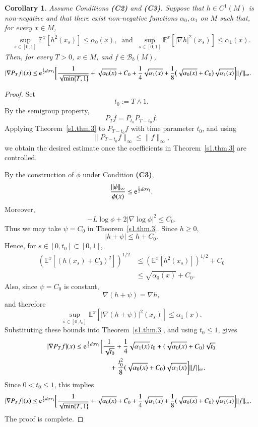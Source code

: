 \documentclass[11pt,twoside, reqno]{article}
\def\e{{\rm e}}
\newcommand\1{\mathbbm{1}}
\newtheorem{corollary}[theorem]{Corollary}
\theoremstyle{definition}
\numberwithin{equation}{section}
\def \e{{\rm e}}
\begin{document}
\begin{corollary}\label{cor-S3-1}
Assume Conditions {\bf(C2)} and {\bf(C3)}. Suppose that \(h\in C^1(M)\) is
non-negative and that there exist non-negative functions
\(\alpha_0,\alpha_1\) on \(M\) such that, for every \(x\in M\),
\begin{align}\label{gradient-ineq-2}
        \sup_{s\in[0,1]}
        \mathbb E^x[h^2(x_s)]
        \leq
        \alpha_0(x),
\ \text{ and }\ 
        \sup_{s\in[0,1]}
        \mathbb E^x[|\nabla h|^2(x_s)]
        \leq
        \alpha_1(x).
\end{align}
Then, for every \(T>0\), \(x\in M\), and \(f\in\mathcal B_b(M)\),
\[
\begin{aligned}
|\nabla P_Tf|(x)
\leq
\e^{\frac12 d\sigma r_1}
\biggl[
&
\frac{1}{\sqrt{\min\{T,1\}}}
+
\sqrt{\alpha_0(x)}+C_0
+\frac{1}{4}\sqrt{\alpha_1(x)}+
\frac18
\bigl(\sqrt{\alpha_0(x)}+C_0\bigr)\sqrt{\alpha_1(x)}
\biggr]
\|f\|_{\infty}.
\end{aligned}
\]
\end{corollary}

\begin{proof}
Set
\[
        t_0:=T\wedge1.
\]
By the semigroup property,
\[
        P_Tf=P_{t_0}P_{T-t_0}f.
\]
Applying Theorem~\ref{s1.thm.3} to \(P_{T-t_0}f\) with time parameter
\(t_0\), and using
\[
        \|P_{T-t_0}f\|_\infty\leq \|f\|_\infty,
\]
we obtain the desired estimate once the coefficients in
Theorem~\ref{s1.thm.3} are controlled.

By the construction of \(\phi\) under Condition {\bf(C3)},
\[
        \frac{\|\phi\|_\infty}{\phi(x)}
        \leq
        \e^{\frac12d\sigma r_1}.
\]
Moreover,
\[
        -L\log\phi+2|\nabla\log\phi|^2\leq C_0.
\]
Thus we may take \(\psi=C_0\) in Theorem~\ref{s1.thm.3}. Since \(h\geq0\),
\[
        |h+\psi|\leq h+C_0.
\]
Hence, for \(s\in[0,t_0]\subset[0,1]\),
\[
\begin{aligned}
\left(\mathbb E^x[(h(x_s)+C_0)^2]\right)^{1/2}
&\leq
\left(\mathbb E^x[h^2(x_s)]\right)^{1/2}+C_0 \\
&\leq
\sqrt{\alpha_0(x)}+C_0 .
\end{aligned}
\]
Also, since \(\psi=C_0\) is constant,
\[
        \nabla(h+\psi)=\nabla h,
\]
and therefore
\[
        \sup_{s\in[0,t_0]}
        \mathbb E^x[|\nabla(h+\psi)|^2(x_s)]
        \leq
        \alpha_1(x).
\]
Substituting these bounds into Theorem~\ref{s1.thm.3}, and using
\(t_0\leq1\), gives
\[
\begin{aligned}
|\nabla P_Tf|(x)
\leq
\e^{\frac12d\sigma r_1}
\biggl[
&
\frac{1}{\sqrt{t_0}}
+
\frac14\sqrt{\alpha_1(x)}\,t_0
+
(\sqrt{\alpha_0(x)}+C_0)\sqrt{t_0}
\\
&\quad
+
\frac{t_0^2}{8}
(\sqrt{\alpha_0(x)}+C_0)\sqrt{\alpha_1(x)}
\biggr]
\|f\|_{\infty}.
\end{aligned}
\]
Since \(0<t_0\leq1\), this implies
\[
\begin{aligned}
|\nabla P_Tf|(x)
\leq
\e^{\frac12d\sigma r_1}
\biggl[
&
\frac{1}{\sqrt{\min\{T,1\}}}
+
\sqrt{\alpha_0(x)}+C_0
+\frac{1}{4}\sqrt{\alpha_1(x)}+
\frac18
(\sqrt{\alpha_0(x)}+C_0)\sqrt{\alpha_1(x)}
\biggr]
\|f\|_{\infty}.
\end{aligned}
\]
The proof is complete.
\end{proof}
\end{document}
